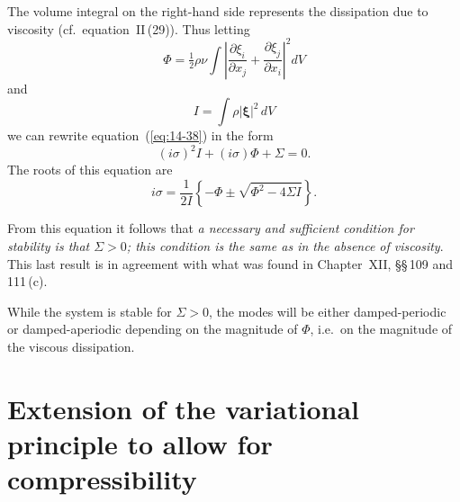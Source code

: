 The volume integral on the right-hand side represents the dissipation due to viscosity (cf.\ equation~II\,(29)). Thus letting
\begin{equation}
\label{eq:14-39}
\Phi = \tfrac{1}{2} \rho \nu \int \left| \frac{\partial \xi_i}{\partial x_j} + \frac{\partial \xi_j}{\partial x_i} \right|^2 dV
\end{equation}
and
\begin{equation}
\label{eq:14-40}
I = \int \rho |\boldsymbol{\xi}|^2 \, dV
\end{equation}
we can rewrite equation~(\ref{eq:14-38}) in the form
\begin{equation}
\label{eq:14-41}
(i\sigma)^2 I + (i\sigma) \Phi + \Sigma = 0.
\end{equation}
The roots of this equation are
\begin{equation}
\label{eq:14-42}
i\sigma = \frac{1}{2I} \left\{ -\Phi \pm \sqrt{\Phi^2 - 4\Sigma I} \right\}.
\end{equation}

From this equation it follows that \emph{a necessary and sufficient condition for stability is that $\Sigma > 0$; this condition is the same as in the absence of viscosity}. This last result is in agreement with what was found in Chapter~XII, \S\S\,109 and 111\,(c).

While the system is stable for $\Sigma > 0$, the modes will be either damped-periodic or damped-aperiodic depending on the magnitude of $\Phi$, i.e.\ on the magnitude of the viscous dissipation.

\section{Extension of the variational principle to allow for compressibility}\label{sec:123}

